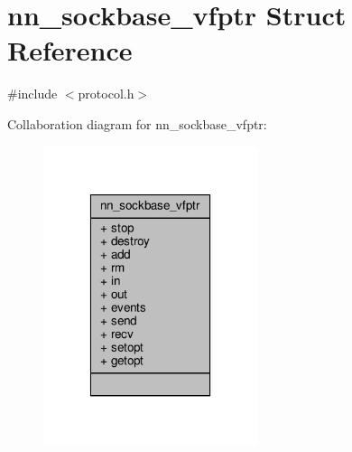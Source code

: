 \hypertarget{structnn__sockbase__vfptr}{}\section{nn\+\_\+sockbase\+\_\+vfptr Struct Reference}
\label{structnn__sockbase__vfptr}


{\ttfamily \#include $<$protocol.\+h$>$}



Collaboration diagram for nn\+\_\+sockbase\+\_\+vfptr\+:\nopagebreak
\begin{figure}[H]
\begin{center}
\leavevmode
\includegraphics[width=178pt]{structnn__sockbase__vfptr__coll__graph}
\end{center}
\end{figure}
